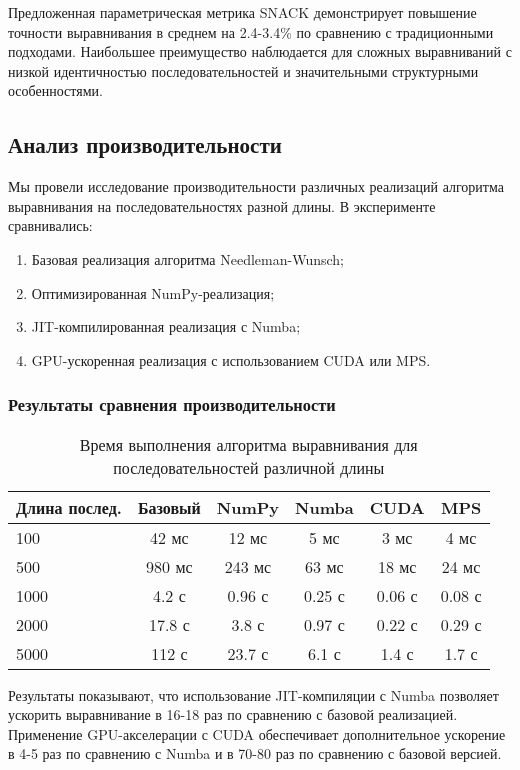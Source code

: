 \documentclass[12pt]{article}
\begin{document}
Предложенная параметрическая метрика SNACK демонстрирует повышение точности выравнивания в среднем на 2.4-3.4\% по сравнению с традиционными подходами. Наибольшее преимущество наблюдается для сложных выравниваний с низкой идентичностью последовательностей и значительными структурными особенностями.

\subsection{Анализ производительности}

Мы провели исследование производительности различных реализаций алгоритма выравнивания на последовательностях разной длины. В эксперименте сравнивались:

\begin{enumerate}
\item Базовая реализация алгоритма Needleman-Wunsch;
\item Оптимизированная NumPy-реализация;
\item JIT-компилированная реализация с Numba;
\item GPU-ускоренная реализация с использованием CUDA или MPS.
\end{enumerate}

\subsubsection{Результаты сравнения производительности}

\begin{table}[h]
\centering
\begin{tabular}{lccccc}
\toprule
\textbf{Длина послед.} & \textbf{Базовый} & \textbf{NumPy} & \textbf{Numba} & \textbf{CUDA} & \textbf{MPS} \\
\midrule
100 & 42 мс & 12 мс & 5 мс & 3 мс & 4 мс \\
500 & 980 мс & 243 мс & 63 мс & 18 мс & 24 мс \\
1000 & 4.2 с & 0.96 с & 0.25 с & 0.06 с & 0.08 с \\
2000 & 17.8 с & 3.8 с & 0.97 с & 0.22 с & 0.29 с \\
5000 & 112 с & 23.7 с & 6.1 с & 1.4 с & 1.7 с \\
\bottomrule
\end{tabular}
\caption{Время выполнения алгоритма выравнивания для последовательностей различной длины}
\label{tab:performance}
\end{table}

Результаты показывают, что использование JIT-компиляции с Numba позволяет ускорить выравнивание в 16-18 раз по сравнению с базовой реализацией. Применение GPU-акселерации с CUDA обеспечивает дополнительное ускорение в 4-5 раз по сравнению с Numba и в 70-80 раз по сравнению с базовой версией. 
\end{document}
